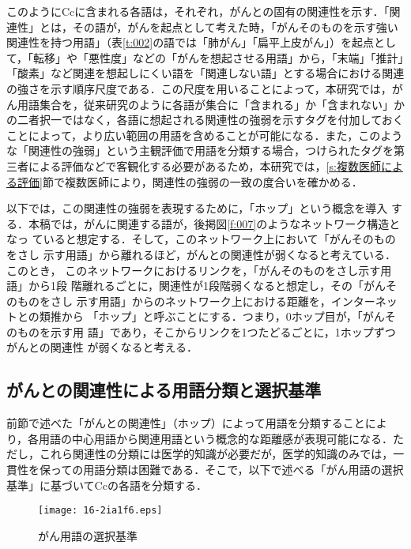 \documentclass[japanese]{jnlp_1.4}
\begin{document}
このようにCcに含まれる各語は，それぞれ，がんとの固有の関連性を示す．「関連性」とは，その語が，がんを起点として考えた時，「がんそのものを示す強い関連性を持つ用語」（表\ref{t:002}の語では「肺がん」「扁平上皮がん」）を起点として，「転移」や「悪性度」などの「がんを想起させる用語」から，「末端」「推計」「酸素」など関連を想起しにくい語を「関連しない語」とする場合における関連の強さを示す順序尺度である．この尺度を用いることによって，本研究では，がん用語集合を，従来研究のように各語が集合に「含まれる」か「含まれない」かの二者択一ではなく，各語に想起される関連性の強弱を示すタグを付加しておくことによって，より広い範囲の用語を含めることが可能になる．また，このような「関連性の強弱」という主観評価で用語を分類する場合，つけられたタグを第三者による評価などで客観化する必要があるため，本研究では，\ref{s:複数医師による評価}節で複数医師により，関連性の強弱の一致の度合いを確かめる．

以下では，この関連性の強弱を表現するために，「ホップ」という概念を導入
する．本稿では，がんに関連する語が，後掲図\ref{f:007}のようなネットワーク構造となっ
ていると想定する．そして，このネットワーク上において「がんそのものをさし
示す用語」から離れるほど，がんとの関連性が弱くなると考えている．このとき，
このネットワークにおけるリンクを，「がんそのものをさし示す用語」から1段
階離れるごとに，関連性が1段階弱くなると想定し，その「がんそのものをさし
示す用語」からのネットワーク上における距離を，インターネットとの類推から
「ホップ」と呼ぶことにする．つまり，0ホップ目が，「がんそのものを示す用
語」であり，そこからリンクを1つたどるごとに，1ホップずつがんとの関連性
が弱くなると考える．


\subsection{がんとの関連性による用語分類と選択基準}
\label{s:がんとの関連性による用語分類と選択基準}


前節で述べた「がんとの関連性」（ホップ）によって用語を分類することにより，各用語の中心用語から関連用語という概念的な距離感が表現可能になる．ただし，これら関連性の分類には医学的知識が必要だが，医学的知識のみでは，一貫性を保っての用語分類は困難である．そこで，以下で述べる「がん用語の選択基準」に基づいてCcの各語を分類する．

\begin{figure}[b]
 \begin{center}
  \texttt{[image: 16-2ia1f6.eps]}
 \end{center}
 \caption{がん用語の選択基準}
 \label{f:006}
\end{figure}
\end{document}
